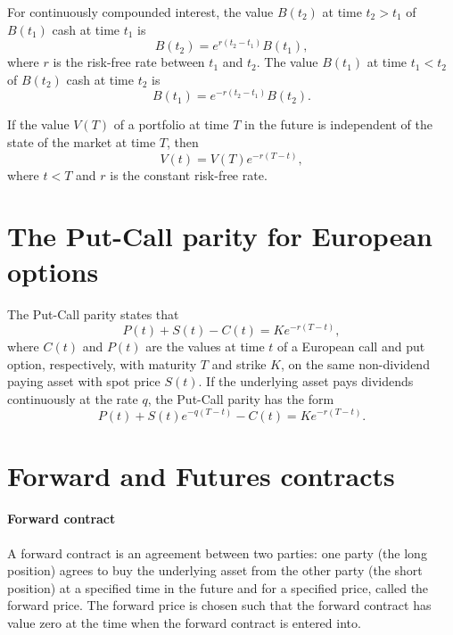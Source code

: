 For continuously compounded interest, the value $ B(t_2) $ at time $ t_2 > t_1 $
    of $ B(t_1) $ cash at time $ t_1 $ is
\begin{equation*}
    B(t_2) = e^{r (t_2 - t_1)} B(t_1),
\end{equation*}
where $ r $ is the risk-free rate between $ t_1 $ and $ t_2 $.
The value $ B(t_1) $ at time $ t_1 < t_2 $ of $ B(t_2) $ cash at time $ t_2 $ is
\begin{equation*}
    B(t_1) = e^{-r (t_2 - t_1)} B(t_2).
\end{equation*}

\begin{lemma}
    If the value $ V(T) $ of a portfolio at time $ T $ in the future is
        independent of the state of the market at time $ T $, then
    \begin{equation}
        V(t) = V(T) e^{-r (T - t)},
        \label{eq:lemma:portfolio-value}
    \end{equation}
    where $ t < T $ and $ r $ is the constant risk-free rate.
\end{lemma}

\section{The Put-Call parity for European options}
The Put-Call parity states that
\begin{equation}
    P(t) + S(t) - C(t) = K e^{-r (T - t)},
    \label{eq:put-call-parity}
\end{equation}
where $ C(t) $ and $ P(t) $ are the values at time $ t $ of a European call and
    put option, respectively, with maturity $ T $ and strike $ K $, on the same
    non-dividend paying asset with spot price $ S(t) $.
If the underlying asset pays dividends continuously at the rate $ q $, the
    Put-Call parity has the form
\begin{equation}
    P(t) + S(t) e^{-q (T - t)} - C(t) = K e^{-r (T - t)}.
    \label{eq:put-call-parity-dividend}
\end{equation}

\section{Forward and Futures contracts}
\paragraph{Forward contract}
A forward contract is an agreement between two parties: one party (the long
    position) agrees to buy the underlying asset from the other party (the
    short position) at a specified time in the future and for a specified price,
    called the forward price.
The forward price is chosen such that the forward contract has value zero at the
    time when the forward contract is entered into.

